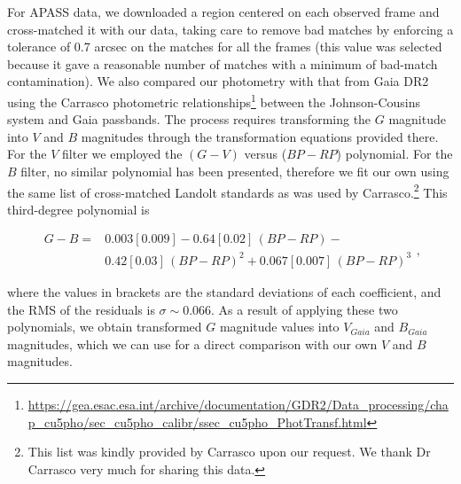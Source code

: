 \documentclass[draft]{aa}
\begin{document}
For APASS data, we downloaded a region centered on each
observed frame and cross-matched it with our data, taking care to remove
bad matches by enforcing a tolerance of 0.7 arcsec on the matches for all the
frames (this value was selected because it gave a reasonable number of
matches with a minimum of bad-match contamination).
%
We also compared our photometry with that from Gaia DR2 using the
Carrasco photometric
relationships\footnote{\url{https://gea.esac.esa.int/archive/documentation/GDR2/Data_processing/chap_cu5pho/sec_cu5pho_calibr/ssec_cu5pho_PhotTransf.html}}
between the Johnson-Cousins system and Gaia passbands. The process
requires transforming the $G$ magnitude into $V$ and $B$ magnitudes through the
transformation equations provided there. For the $V$ filter we employed the
$(G-V)$ versus ($BP-RP$) polynomial. For the $B$ filter, no similar
polynomial has been presented, therefore we fit our own using the same list of
cross-matched Landolt standards as was used by Carrasco.\footnote{This list was kindly
provided by Carrasco upon our request. We thank Dr Carrasco very much for
sharing this data.} This third-degree polynomial is

\begin{equation}
\begin{aligned}
G - B = {} & 0.003[0.009]-0.64[0.02]\,(BP-RP)- \\
        & 0.42[0.03]\,(BP-RP)^2+0.067[0.007]\,(BP-RP)^3
\end{aligned}
,\end{equation}

\noindent
where the values in brackets are the standard deviations of each
coefficient, and the RMS of the residuals is $\sigma\sim0.066$.
As a result of applying these two polynomials, we obtain transformed $G$
magnitude values into $V_{Gaia}$ and $B_{Gaia}$ magnitudes, which we can use for a direct
comparison with our own $V$ and $B$ magnitudes.
\end{document}
